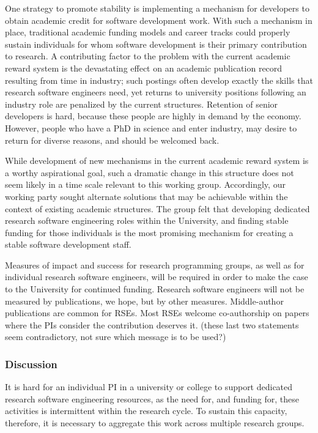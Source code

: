 One strategy to promote stability is implementing a mechanism for developers to obtain academic
credit for software development work. With such a mechanism in place, traditional academic funding
models and career tracks could properly sustain individuals for whom software development is their
primary contribution to research. A contributing factor to the problem with the current academic reward system is the
devastating effect on an academic
publication record resulting from time in industry; such postings often develop exactly the skills that research software
engineers need, yet returns to university positions following an industry role are penalized by the current structures.
Retention of senior developers is hard, because these people are highly in demand by the economy. However, people who have a
PhD in science and enter industry, may desire to return for diverse reasons, and should be welcomed back.

While development of new mechanisms in the current academic reward system is a worthy aspirational goal, such a dramatic
change in this structure does not seem likely in a time scale relevant to this working group. Accordingly, our working party
sought alternate solutions that may be achievable within the context of existing academic structures. The group felt that
developing dedicated research software engineering roles within the University, and finding stable funding for those individuals is the most promising mechanism for creating a stable software development staff.

Measures of impact and success for research programming groups, as well as for individual research software engineers, will
be required in order to make the case to the University for continued funding. Research software engineers will not be measured by publications, we hope, but by other measures.  Middle-author publications are common for RSEs. Most RSEs welcome co-authorship on papers where the PIs consider the contribution deserves it.
(these last two statements seem contradictory, not sure which message is to be used?)

\subsubsection{Discussion}

It is hard for an individual PI in a university or college to support dedicated research software engineering resources, as
the need for, and funding for, these activities is intermittent within the research cycle. To sustain this capacity, therefore, it is necessary to aggregate this work across multiple research groups.

